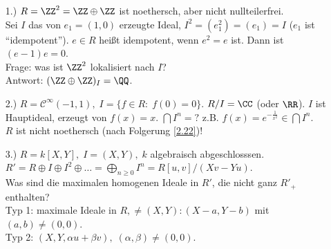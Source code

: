 \begin{nnBsp}
  \begin{enumerate}
    \item[1.)] $R = \ZZ^2 = \ZZ \oplus \ZZ$ ist noethersch, aber nicht nullteilerfrei.\\
    Sei $I$ das von $e_1 = (1,0)$ erzeugte Ideal, $I^2 = (e_1^2)= (e_1) = I$ ($e_1$ ist "`idempotent"').
    $e \in R$ heißt idempotent, wenn $e^2 = e$ ist. Dann ist $(e-1)e = 0$.\\
    Frage: was ist $\ZZ^2$ lokalisiert nach $I$?\\
    Antwort: $(\ZZ \oplus \ZZ)_I = \QQ$.
    \item[2.)] $R = \mathcal{C}^{\infty}(-1,1), \; I = \{f \in R: \; f(0)=0\}$. $R/I = \CC$ (oder $\RR$).
    $I$ ist Hauptideal, erzeugt von $f(x) = x$. $\bigcap I^n = ?$ z.B. $f(x) = e^{-\frac{1}{x^2}} \in \bigcap I^n$.\\
    $R$ ist nicht noethersch (nach Folgerung \ref{2.22})!
    \item[3.)] $R = k[X,Y], \; I = (X,Y), \; k$ algebraisch abgeschlosssen.\\
    $R' = R \oplus I \oplus I^2 \oplus \dots = \bigoplus_{n \geq 0} I^n = R[u,v]/(X v - Y u)$.\\
    Was sind die maximalen homogenen Ideale in $R'$, die nicht ganz $R'_+$ enthalten?\\
    Typ 1: maximale Ideale in $R, \not= (X,Y): (X-a, Y-b)$ mit $(a,b) \not=(0,0)$.\\
    Typ 2: $(X,Y, \alpha u + \beta v), \; (\alpha, \beta) \not= (0,0)$.
  \end{enumerate}
\end{nnBsp}
